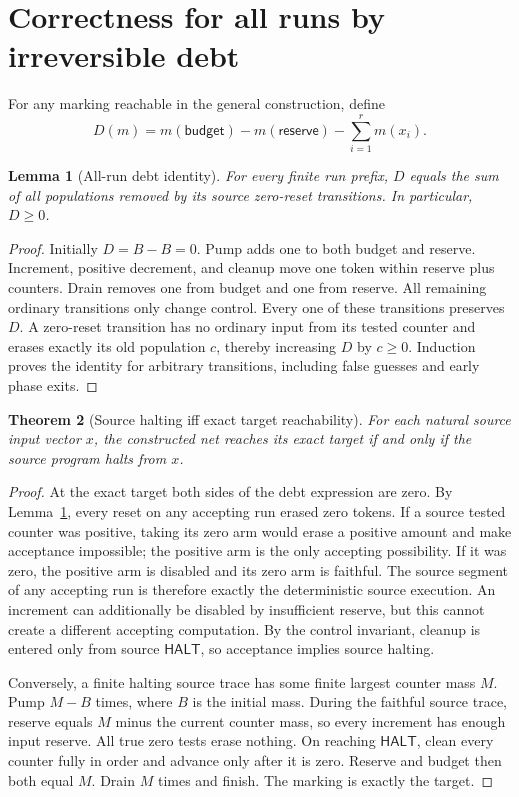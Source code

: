 \documentclass[11pt,letterpaper]{article}
\newtheorem{theorem}{Theorem}[section]
\newtheorem{lemma}[theorem]{Lemma}
\theoremstyle{definition}
\theoremstyle{remark}
\newcommand{\HALT}{\mathsf{HALT}}
\newcommand{\res}{\mathsf{reserve}}
\newcommand{\bud}{\mathsf{budget}}
\begin{document}
\section{Correctness for all runs by irreversible debt}
\label{qoc:rn:sec:debt}
For any marking reachable in the general construction, define
\[
 D(m)=m(\bud)-m(\res)-\sum_{i=1}^r m(x_i).
\]
\begin{lemma}[All-run debt identity]
\label{qoc:rn:lem:debt}
For every finite run prefix, $D$ equals the sum of all populations removed by its source zero-reset transitions. In particular, $D\geq0$.
\end{lemma}
\begin{proof}
Initially $D=B-B=0$. Pump adds one to both budget and reserve. Increment, positive decrement, and cleanup move one token within reserve plus counters. Drain removes one from budget and one from reserve. All remaining ordinary transitions only change control. Every one of these transitions preserves $D$. A zero-reset transition has no ordinary input from its tested counter and erases exactly its old population $c$, thereby increasing $D$ by $c\geq0$. Induction proves the identity for arbitrary transitions, including false guesses and early phase exits.
\end{proof}

\begin{theorem}[Source halting iff exact target reachability]
\label{qoc:rn:thm:reduction}
For each natural source input vector $x$, the constructed net reaches its exact target if and only if the source program halts from $x$.
\end{theorem}
\begin{proof}
At the exact target both sides of the debt expression are zero. By Lemma~\ref{qoc:rn:lem:debt}, every reset on any accepting run erased zero tokens. If a source tested counter was positive, taking its zero arm would erase a positive amount and make acceptance impossible; the positive arm is the only accepting possibility. If it was zero, the positive arm is disabled and its zero arm is faithful. The source segment of any accepting run is therefore exactly the deterministic source execution. An increment can additionally be disabled by insufficient reserve, but this cannot create a different accepting computation. By the control invariant, cleanup is entered only from source $\HALT$, so acceptance implies source halting.

Conversely, a finite halting source trace has some finite largest counter mass $M$. Pump $M-B$ times, where $B$ is the initial mass. During the faithful source trace, reserve equals $M$ minus the current counter mass, so every increment has enough input reserve. All true zero tests erase nothing. On reaching $\HALT$, clean every counter fully in order and advance only after it is zero. Reserve and budget then both equal $M$. Drain $M$ times and finish. The marking is exactly the target.
\end{proof}
\end{document}
